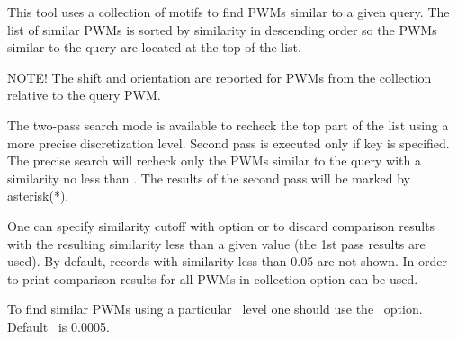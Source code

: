 This tool uses a collection of motifs to find PWMs similar to a given query. 
The list of similar PWMs is sorted by similarity in descending order so the PWMs similar to the query are 
located at the top of the list.

NOTE! The shift and orientation are reported for PWMs from the collection relative to the query 
PWM.


The two-pass search mode is available to recheck the top part of the list using a more precise discretization level. Second pass is executed only 
if 
key is specified. The precise search will recheck only the PWMs 
similar to the query with a similarity no less than . The results of the second pass 
will be marked by asterisk(*).

One can specify similarity cutoff with option  or  to discard 
comparison results with the resulting similarity less than a given value (the 1st pass results are used). 
By default, records with similarity less than 0.05 are not shown.
In order to print comparison results for all PWMs in collection  option can be used.


To find similar PWMs using a particular \pvalue\ level one should use the ~option. Default \pvalue\ is 0.0005.

\exampleof{}
